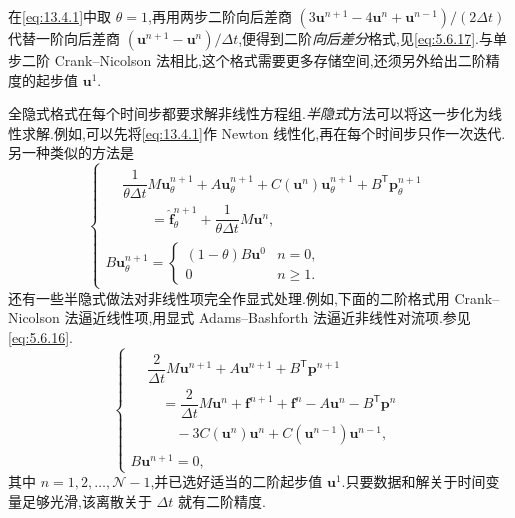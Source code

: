 在\eqref{eq:13.4.1}中取 \(\theta=1\),再用两步二阶向后差商 \((3\boldsymbol{u}^{n+1}-4\boldsymbol{u}^n+\boldsymbol{u}^{n-1})/(2\Delta t)\) 代替一阶向后差商 \((\boldsymbol{u}^{n+1}-\boldsymbol{u}^n)/\Delta t\),便得到二阶\emph{向后差分}格式,见\eqref{eq:5.6.17}.与单步二阶 Crank--Nicolson 法相比,这个格式需要更多存储空间,还须另外给出二阶精度的起步值 \(\boldsymbol{u}^1\).

全隐式格式在每个时间步都要求解非线性方程组.\emph{半隐式}方法可以将这一步化为线性求解.例如,可以先将\eqref{eq:13.4.1}作 Newton 线性化,再在每个时间步只作一次迭代.另一种类似的方法是
\begin{equation}\label{eq:13.4.3}
  \begin{cases}
    \begin{aligned}
      &\dfrac1{\theta\Delta t}M\boldsymbol{u}_\theta^{n+1}
        +A\boldsymbol{u}_\theta^{n+1}+C(\boldsymbol{u}^n)\boldsymbol{u}_\theta^{n+1}
        +B^{\mathsf T}\boldsymbol{p}_\theta^{n+1}\\
      &\qquad=\widehat{\boldsymbol{f}}_\theta^{n+1}+\dfrac1{\theta\Delta t}M\boldsymbol{u}^n,
    \end{aligned}\\[2pt]
    B\boldsymbol{u}_\theta^{n+1}=
      \begin{cases}
        (1-\theta)B\boldsymbol{u}^0 & n=0,\\
        0 & n\ge1.
      \end{cases}
  \end{cases}
\end{equation}
还有一些半隐式做法对非线性项完全作显式处理.例如,下面的二阶格式用 Crank--Nicolson 法逼近线性项,用显式 Adams--Bashforth 法逼近非线性对流项.参见\eqref{eq:5.6.16}.
\begin{equation}\label{eq:13.4.4}
  \begin{cases}
    \begin{aligned}
      &\dfrac2{\Delta t}M\boldsymbol{u}^{n+1}+A\boldsymbol{u}^{n+1}+B^{\mathsf T}\boldsymbol{p}^{n+1}\\
      &\quad=\dfrac2{\Delta t}M\boldsymbol{u}^n+\boldsymbol{f}^{n+1}+\boldsymbol{f}^n
         -A\boldsymbol{u}^n-B^{\mathsf T}\boldsymbol{p}^n\\
      &\qquad-3C(\boldsymbol{u}^n)\boldsymbol{u}^n+C(\boldsymbol{u}^{n-1})\boldsymbol{u}^{n-1},
    \end{aligned}\\[2pt]
    B\boldsymbol{u}^{n+1}=0,
  \end{cases}
\end{equation}
其中 \(n=1,2,\ldots,\mathcal N-1\),并已选好适当的二阶起步值 \(\boldsymbol{u}^1\).只要数据和解关于时间变量足够光滑,该离散关于 \(\Delta t\) 就有二阶精度.


